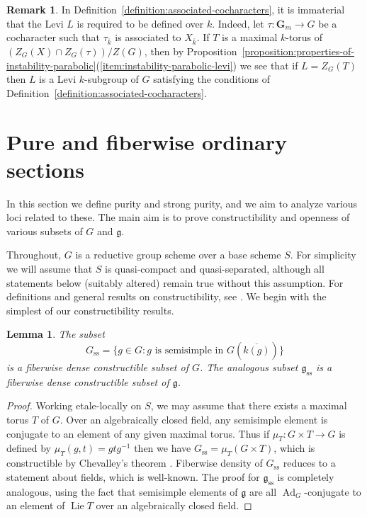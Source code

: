 \documentclass[11pt,reqno]{amsart}
\newtheorem{lemma}[theorem]{Lemma}
\theoremstyle{definition}
\newtheorem{remark}[theorem]{Remark}
\renewcommand{\rm}{\mathrm}
\newcommand{\bG}{{\mathbf G}}
\newcommand{\fg}{\mathfrak{g}}
\DeclareMathOperator{\Ad}{Ad}
\DeclareMathOperator{\Lie}{Lie}
\begin{document}
\begin{remark}
In Definition~\ref{definition:associated-cocharacters}, it is immaterial that the Levi $L$ is required to be defined over $k$. Indeed, let $\tau: \bG_m \to G$ be a cocharacter such that $\tau_{\overline{k}}$ is associated to $X_{\overline{k}}$. If $T$ is a maximal $k$-torus of $(Z_G(X) \cap Z_G(\tau))/Z(G)$, then by Proposition~\ref{proposition:properties-of-instability-parabolic}(\ref{item:instability-parabolic-levi}) we see that if $L = Z_G(T)$ then $L$ is a Levi $k$-subgroup of $G$ satisfying the conditions of Definition~\ref{definition:associated-cocharacters}.
\end{remark}




















\section{Pure and fiberwise ordinary sections}\label{section:constructibility-nonsense}

In this section we define purity and strong purity, and we aim to analyze various loci related to these. The main aim is to prove constructibility and openness of various subsets of $G$ and $\fg$. \smallskip

Throughout, $G$ is a reductive group scheme over a base scheme $S$. For simplicity we will assume that $S$ is quasi-compact and quasi-separated, although all statements below (suitably altered) remain true without this assumption. For definitions and general results on constructibility, see \cite[0\textsubscript{III}, \S 9; IV\textsubscript{1}, \S 1.8-9]{EGA}. We begin with the simplest of our constructibility results.

\begin{lemma}\label{lemma:semisimple-locus-is-open}
The subset
\[
G_{\rm{ss}} = \{g \in G: g \text{ is semisimple in } G(\overline{k(g)})\}
\]
is a fiberwise dense constructible subset of $G$. The analogous subset $\fg_{\rm{ss}}$ is a fiberwise dense constructible subset of $\fg$.
\end{lemma}

\begin{proof}
Working etale-locally on $S$, we may assume that there exists a maximal torus $T$ of $G$. Over an algebraically closed field, any semisimple element is conjugate to an element of any given maximal torus. Thus if $\mu_T: G \times T \to G$ is defined by $\mu_T(g, t) = gtg^{-1}$ then we have $G_{\rm{ss}} = \mu_T(G \times T)$, which is constructible by Chevalley's theorem \cite[IV\textsubscript{1}, Thm.\ 1.8.4]{EGA}. Fiberwise density of $G_{\rm{ss}}$ reduces to a statement about fields, which is well-known. The proof for $\fg_{\rm{ss}}$ is completely analogous, using the fact that semisimple elements of $\fg$ are all $\Ad_G$-conjugate to an element of $\Lie T$ over an algebraically closed field.
\end{proof}
\end{document}
